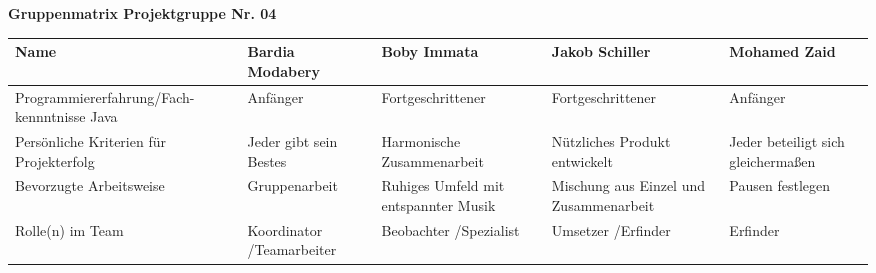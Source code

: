 \documentclass{article}
\begin{document}
\textbf{Gruppenmatrix Projektgruppe Nr. 04 }
\vspace{1cm}

\begin{tabular}{|p{5cm}|p{3cm}|p{3cm}|p{3cm}|p{3cm}|}
  \hline
  \textbf{Name }&Bardia Modabery&Boby Immata&Jakob Schiller&Mohamed Zaid\\
  \hline
  Programmiererfahrung/Fach-kennntnisse Java & Anfänger &  Fortgeschrittener & Fortgeschrittener & Anfänger \\
  \hline
  Persönliche Kriterien für Projekterfolg & Jeder gibt sein Bestes & Harmonische Zusammenarbeit & Nützliches Produkt entwickelt& Jeder beteiligt sich gleichermaßen \\
  \hline
  Bevorzugte Arbeitsweise & Gruppenarbeit& Ruhiges Umfeld mit entspannter Musik& Mischung aus Einzel und Zusammenarbeit&  Pausen festlegen\\
  \hline
  Rolle(n) im Team &Koordinator /Teamarbeiter & Beobachter /Spezialist & Umsetzer /Erfinder & Erfinder \\
  \hline
 
\end{tabular}
\end{document}
